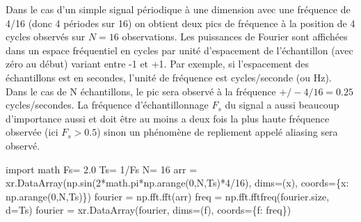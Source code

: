 \documentclass[
  11pt,
  letterpaper,
  open=any,
  twoside=false,
  french]{scrbook}
\newenvironment{Shaded}{\begin{snugshade}}{\end{snugshade}}
\newcommand{\DecValTok}[1]{\textcolor[rgb]{0.68,0.00,0.00}{#1}}
\newcommand{\FloatTok}[1]{\textcolor[rgb]{0.68,0.00,0.00}{#1}}
\newcommand{\ImportTok}[1]{\textcolor[rgb]{0.00,0.46,0.62}{#1}}
\newcommand{\NormalTok}[1]{\textcolor[rgb]{0.00,0.23,0.31}{#1}}
\newcommand{\OperatorTok}[1]{\textcolor[rgb]{0.37,0.37,0.37}{#1}}
\newcommand{\StringTok}[1]{\textcolor[rgb]{0.13,0.47,0.30}{#1}}
\begin{document}
Dans le cas d'un simple signal périodique à une dimension avec une
fréquence de 4/16 (donc 4 périodes sur 16) on obtient deux pics de
fréquence à la position de 4 cycles observés sur \(N=16\) observations.
Les puissances de Fourier sont affichées dans un espace fréquentiel en
cycles par unité d'espacement de l'échantillon (avec zéro au début)
variant entre -1 et +1. Par exemple, si l'espacement des échantillons
est en secondes, l'unité de fréquence est cycles/seconde (ou Hz). Dans
le cas de N échantillons, le pic sera observé à la fréquence
\(+/- 4/16=0.25\) cycles/secondes. La fréquence d'échantillonnage
\(F_s\) du signal a aussi beaucoup d'importance aussi et doit être au
moins a deux fois la plus haute fréquence observée (ici \(F_s > 0.5\))
sinon un phénomène de repliement appelé aliasing sera observé.

\begin{Shaded}
\begin{Highlighting}[]
\ImportTok{import}\NormalTok{ math}
\NormalTok{Fs}\OperatorTok{=} \FloatTok{2.0}
\NormalTok{Ts}\OperatorTok{=} \DecValTok{1}\OperatorTok{/}\NormalTok{Fs}
\NormalTok{N}\OperatorTok{=} \DecValTok{16}
\NormalTok{arr }\OperatorTok{=}\NormalTok{ xr.DataArray(np.sin(}\DecValTok{2}\OperatorTok{*}\NormalTok{math.pi}\OperatorTok{*}\NormalTok{np.arange(}\DecValTok{0}\NormalTok{,N,Ts)}\OperatorTok{*}\DecValTok{4}\OperatorTok{/}\DecValTok{16}\NormalTok{),}
\NormalTok{                   dims}\OperatorTok{=}\NormalTok{(}\StringTok{\textquotesingle{}x\textquotesingle{}}\NormalTok{), coords}\OperatorTok{=}\NormalTok{\{}\StringTok{\textquotesingle{}x\textquotesingle{}}\NormalTok{: np.arange(}\DecValTok{0}\NormalTok{,N,Ts)\})}
\NormalTok{fourier }\OperatorTok{=}\NormalTok{ np.fft.fft(arr)}
\NormalTok{freq }\OperatorTok{=}\NormalTok{ np.fft.fftfreq(fourier.size, d}\OperatorTok{=}\NormalTok{Ts)}
\NormalTok{fourier }\OperatorTok{=}\NormalTok{ xr.DataArray(fourier,}
\NormalTok{                   dims}\OperatorTok{=}\NormalTok{(}\StringTok{\textquotesingle{}f\textquotesingle{}}\NormalTok{), coords}\OperatorTok{=}\NormalTok{\{}\StringTok{\textquotesingle{}f\textquotesingle{}}\NormalTok{: freq\})}


\end{Highlighting}
\end{Shaded}
\end{document}
